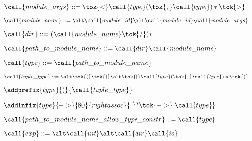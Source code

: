  
   \item $\call{module\_args} ::=
   \tok{<} \call{type} (\tok{,} \call{type})* \tok{>}$
   
 
   \item $\call{module\_name} ::= \\
   \alt \call{module\_id} \\
   \alt \call{module\_id}\call{module\_args}$
    
 
   \item $\call{dir} ::= (\call{module\_name} \tok{/})*$
   \item $\call{path\_to\_module\_name} ::=  \call{dir}\call{module\_name}$
   

  \item $\call{type} ::= \call{path\_to\_module\_name}$
   
 
   \item $\call{tuple\_type} ::= \\
    \alt \tok{(}\tok{)}\\
    \alt \tok{(} \call{type} (\tok{,} \call{type})* \tok{)}$
   \item $\addprefix{type}{(}{\call{tuple\_type}}$
    

  \item $\addinfix{type}{->}{80}{rightassoc}{
  {}^{\ \backslash{}n}\tok{->}\ \call{type}}$


  \item $\call{path\_to\_module\_name\_allow\_type\_constr} ::= \call{type}$
  

  \item $\call{exp} ::=\\
  \alt \call{int}\\
  \alt \call{dir}\call{id}$
   

